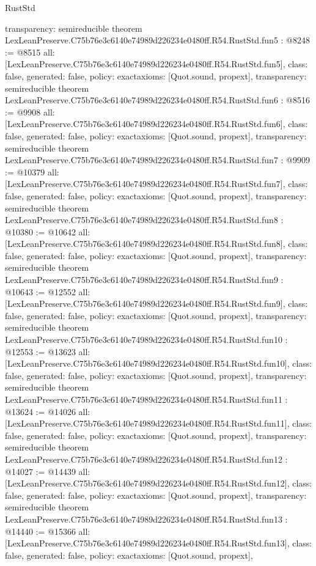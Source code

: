 \begin{lexlean}{RustStd}
\begin{coremodule}
{  transparency: semireducible
}
theorem LexLeanPreserve.C75b76e3c6140e74989d226234e0480ff.R54.RustStd.fun5 : @8248 := @8515 {
  all: [LexLeanPreserve.C75b76e3c6140e74989d226234e0480ff.R54.RustStd.fun5],
  class: false,
  generated: false,
  policy: exact{axioms: [Quot.sound, propext]},
  transparency: semireducible
}
theorem LexLeanPreserve.C75b76e3c6140e74989d226234e0480ff.R54.RustStd.fun6 : @8516 := @9908 {
  all: [LexLeanPreserve.C75b76e3c6140e74989d226234e0480ff.R54.RustStd.fun6],
  class: false,
  generated: false,
  policy: exact{axioms: [Quot.sound, propext]},
  transparency: semireducible
}
theorem LexLeanPreserve.C75b76e3c6140e74989d226234e0480ff.R54.RustStd.fun7 : @9909 := @10379 {
  all: [LexLeanPreserve.C75b76e3c6140e74989d226234e0480ff.R54.RustStd.fun7],
  class: false,
  generated: false,
  policy: exact{axioms: [Quot.sound, propext]},
  transparency: semireducible
}
theorem LexLeanPreserve.C75b76e3c6140e74989d226234e0480ff.R54.RustStd.fun8 : @10380 := @10642 {
  all: [LexLeanPreserve.C75b76e3c6140e74989d226234e0480ff.R54.RustStd.fun8],
  class: false,
  generated: false,
  policy: exact{axioms: [Quot.sound, propext]},
  transparency: semireducible
}
theorem LexLeanPreserve.C75b76e3c6140e74989d226234e0480ff.R54.RustStd.fun9 : @10643 := @12552 {
  all: [LexLeanPreserve.C75b76e3c6140e74989d226234e0480ff.R54.RustStd.fun9],
  class: false,
  generated: false,
  policy: exact{axioms: [Quot.sound, propext]},
  transparency: semireducible
}
theorem LexLeanPreserve.C75b76e3c6140e74989d226234e0480ff.R54.RustStd.fun10 : @12553 := @13623 {
  all: [LexLeanPreserve.C75b76e3c6140e74989d226234e0480ff.R54.RustStd.fun10],
  class: false,
  generated: false,
  policy: exact{axioms: [Quot.sound, propext]},
  transparency: semireducible
}
theorem LexLeanPreserve.C75b76e3c6140e74989d226234e0480ff.R54.RustStd.fun11 : @13624 := @14026 {
  all: [LexLeanPreserve.C75b76e3c6140e74989d226234e0480ff.R54.RustStd.fun11],
  class: false,
  generated: false,
  policy: exact{axioms: [Quot.sound, propext]},
  transparency: semireducible
}
theorem LexLeanPreserve.C75b76e3c6140e74989d226234e0480ff.R54.RustStd.fun12 : @14027 := @14439 {
  all: [LexLeanPreserve.C75b76e3c6140e74989d226234e0480ff.R54.RustStd.fun12],
  class: false,
  generated: false,
  policy: exact{axioms: [Quot.sound, propext]},
  transparency: semireducible
}
theorem LexLeanPreserve.C75b76e3c6140e74989d226234e0480ff.R54.RustStd.fun13 : @14440 := @15366 {
  all: [LexLeanPreserve.C75b76e3c6140e74989d226234e0480ff.R54.RustStd.fun13],
  class: false,
  generated: false,
  policy: exact{axioms: [Quot.sound, propext]},
}
\end{coremodule}
\end{lexlean}
